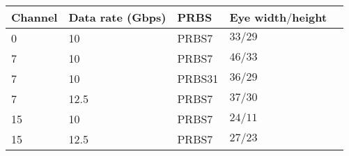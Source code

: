 \documentclass{standalone}
\begin{document}

\begin{tabular}{l l l l l}
\toprule
	Channel & Data rate (Gbps) & PRBS & Eye width$/$height \\
\midrule
	0 & 10 & PRBS7 & $33 / 29$ \\
	7 & 10 & PRBS7 & $46 / 33$ \\
	7 & 10 & PRBS31 & $36 / 29$ \\
	7 & 12.5 & PRBS7 & $37 / 30$ \\
	15 & 10 & PRBS7 & $24 / 11$ \\
	15 & 12.5 & PRBS7 & $27 / 23$ \\
\bottomrule
\end{tabular}
\end{document}
